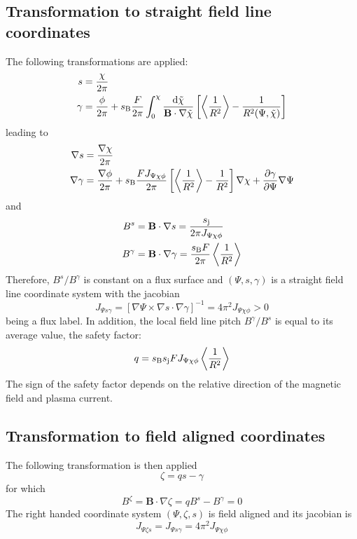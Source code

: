 \documentclass[a4paper,12pt]{article}
\newcommand{\ind}[1]{\ensuremath{_{\rm{#1}}}}
\begin{document}
\subsection{Transformation to straight field line coordinates}
The following transformations are applied:
\begin{equation}
\begin{aligned}
s&= \frac{\chi}{2\pi}\nonumber \\
\gamma&= \frac{\phi}{2\pi}+s\ind{B}\frac{F}{2\pi} \int_0^\chi\frac{{\rm d}\tilde{\chi}}{\textbf{B}\cdot\nabla\tilde{\chi}}\left[\left<\frac{1}{R^2} \right>
-\frac{1}{R^2(\Psi,\tilde{\chi})}\right]\nonumber
\end{aligned}
\end{equation}
leading to
\begin{equation}
\begin{aligned}
\nabla s&= \frac{\nabla\chi}{2\pi} \nonumber \\
\nabla \gamma&= \frac{\nabla\phi}{2\pi} +
s\ind{B}\frac{FJ_{\Psi\chi\phi}}{2\pi}\left[\left<\frac{1}{R^2} \right> -\frac{1}{R^2}\right]\nabla\chi + \frac{\partial \gamma}{\partial \Psi}\nabla\Psi \nonumber 
\end{aligned}
\end{equation}
and
\begin{equation}
\begin{aligned}
B^s&=\textbf{B}\cdot\nabla s=\frac{s\ind{j}}{2\pi J_{\Psi\chi\phi}} \nonumber \\
B^\gamma&=\textbf{B}\cdot\nabla\gamma=\frac{s\ind{B}F}{2\pi}\left<\frac{1}{R^2} \right> \nonumber
\end{aligned}
\end{equation}
Therefore, $B^s/B^\gamma$ is constant on a flux surface and $\left(\Psi,s,\gamma\right)$ is a straight field line coordinate system with the jacobian 
$$J_{\Psi s \gamma}=\left[\nabla\Psi\times\nabla s\cdot\nabla\gamma\right]^{-1}=4\pi^2J_{\Psi\chi\phi}>0$$ being a flux label.
In addition, the local field line pitch $B^\gamma/B^s$ is equal to its average value, the safety factor: $$q=s\ind{B}s\ind{j}FJ_{\Psi\chi\phi}\left<\frac{1}{R^2} \right>$$
The sign of the safety factor depends on the relative direction of the magnetic field and plasma current. 

\subsection{Transformation to field aligned coordinates}
The following transformation is then applied
$$\zeta=qs-\gamma$$
for which 
$$B^\zeta=\textbf{B}\cdot\nabla\zeta=qB^s-B^\gamma=0$$
The right handed coordinate system $\left(\Psi,\zeta,s\right)$ is field aligned and its jacobian is $$J_{\Psi\zeta s}=J_{\Psi s \gamma}=4\pi^2J_{\Psi\chi\phi}$$
\end{document}
